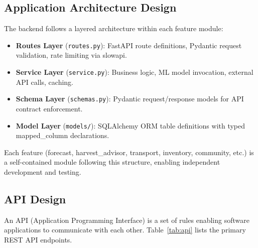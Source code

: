 \documentclass[12pt,a4paper]{report}
\begin{document}
\subsection{Application Architecture Design}

The backend follows a layered architecture within each feature module:

\begin{itemize}
    \item \textbf{Routes Layer} (\texttt{routes.py}): FastAPI route definitions,
    Pydantic request validation, rate limiting via slowapi.
    \item \textbf{Service Layer} (\texttt{service.py}): Business logic, ML model
    invocation, external API calls, caching.
    \item \textbf{Schema Layer} (\texttt{schemas.py}): Pydantic request/response
    models for API contract enforcement.
    \item \textbf{Model Layer} (\texttt{models/}): SQLAlchemy ORM table definitions
    with typed mapped\_column declarations.
\end{itemize}

Each feature (forecast, harvest\_advisor, transport, inventory, community, etc.) is
a self-contained module following this structure, enabling independent development
and testing.

\subsection{API Design}

An API (Application Programming Interface) is a set of rules enabling software
applications to communicate with each other. Table~\ref{tab:api} lists the primary
REST API endpoints.
\end{document}
